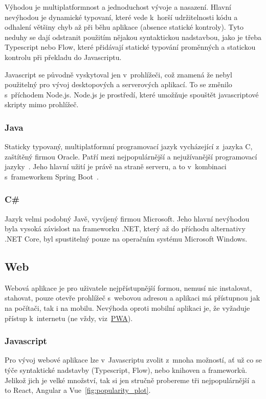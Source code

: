 Výhodou je multiplatformnost a jednoduchost vývoje a nasazení. Hlavní nevýhodou je dynamické typovaní, které vede k~horší udržitelnosti kódu a odhalení většiny chyb až při běhu aplikace (absence statické kontroly). Tyto neduhy se dají odstranit použitím nějakou syntaktickou nadstavbou, jako je třeba Typescript nebo Flow, které přidávají statické typování proměnných a statickou kontrolu při překladu do Javascriptu.

Javascript se původně vyskytoval jen v~prohlížeči, což znamená že nebyl použitelný pro vývoj desktopových a serverových aplikací. To se změnilo s~příchodem Node.js. Node.js je prostředí, které umožňuje spouštět javascriptové skripty mimo prohlížeč.

\subsubsection*{Java}
Staticky typovaný, multiplatformní programovací jazyk vycházející z~jazyka C, zaštítěný firmou Oracle. Patří mezi nejpopulárnější a nejužívanější programovací jazyky~\cite{stackexchangeinc_2019_stack}. Jeho hlavní užití je právě na straně serveru, a to v~kombinaci s~frameworkem Spring Boot~\cite{jetbrainssro_2019_demographics}.

\subsubsection*{C\# }
Jazyk velmi podobný Javě, vyvíjený firmou Microsoft. Jeho hlavní nevýhodou byla vysoká závislost na frameworku .NET, který až do příchodu alternativy .NET Core, byl spustitelný pouze na operačním systému Microsoft Windows.

\subsection{Web}
\label{ss:web}
Webová aplikace je pro uživatele nejpřístupnější formou, nemusí nic instalovat, stahovat, pouze otevře prohlížeč s~webovou adresou a aplikaci má přístupnou jak na počítači, tak i na mobilu. Nevýhoda oproti mobilní aplikaci je, že vyžaduje přístup k~internetu (ne vždy, viz~\hyperref[sss:pwa]{PWA}).

\subsubsection*{Javascript}
\label{ss:javascript}
Pro vývoj webové aplikace lze v~Javascriptu zvolit z~mnoha možností, ať už co se týče syntaktické nadstavby (Typescript, Flow), nebo knihoven a frameworků. Jelikož jich je velké množství, tak si jen stručně probereme tři nejpopulárnější a to React, Angular a Vue~\ref{fig:popularity_plot}.

